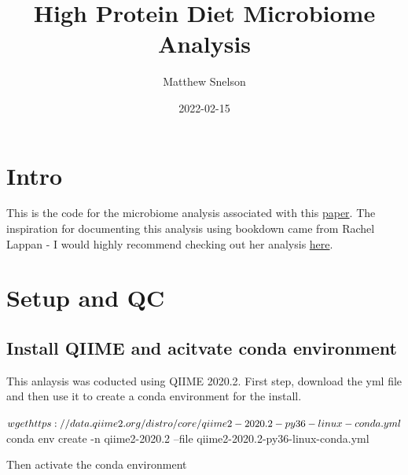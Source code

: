 \documentclass[
]{book}
\title{High Protein Diet Microbiome Analysis}
\author{Matthew Snelson}
\date{2022-02-15}
\newenvironment{Shaded}{\begin{snugshade}}{\end{snugshade}}
\newcommand{\ExtensionTok}[1]{#1}
\newcommand{\FunctionTok}[1]{\textcolor[rgb]{0.00,0.00,0.00}{#1}}
\newcommand{\NormalTok}[1]{#1}
\begin{document}
\maketitle

{
\setcounter{tocdepth}{1}
\tableofcontents
}
\hypertarget{intro}{%
\chapter{Intro}\label{intro}}

This is the code for the microbiome analysis associated with this \href{https://pubmed.ncbi.nlm.nih.gov/33547877/}{paper}. The inspiration for documenting this analysis using bookdown came from Rachel Lappan - I would highly recommend checking out her analysis \href{https://rachaellappan.github.io/VL-QIIME2-analysis/pre-processing-of-sequence-reads.html}{here}.

\hypertarget{setup-and-qc}{%
\chapter{Setup and QC}\label{setup-and-qc}}

\hypertarget{install-qiime-and-acitvate-conda-environment}{%
\section{Install QIIME and acitvate conda environment}\label{install-qiime-and-acitvate-conda-environment}}

This anlaysis was coducted using QIIME 2020.2. First step, download the yml file and then use it to create a conda environment for the install.

\begin{Shaded}
\begin{Highlighting}[]
\NormalTok{$ }\FunctionTok{wget}\NormalTok{ https://data.qiime2.org/distro/core/qiime2-2020.2-py36-linux-conda.yml}
\NormalTok{$ }\ExtensionTok{conda}\NormalTok{ env create -n qiime2-2020.2 --file qiime2-2020.2-py36-linux-conda.yml}
\end{Highlighting}
\end{Shaded}

Then activate the conda environment

\begin{Shaded}
\end{Shaded}
\end{document}
